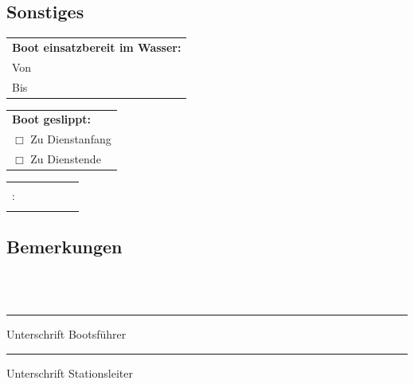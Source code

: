 \documentclass[a4paper, notitlepage, 10pt]{scrreprt}
\newcommand{\phantomspace}{\vphantom{A}}
\begin{document}
\begin{minipage}{\linewidth}
\vspace{4pt}\subsection*{Sonstiges}\vspace{-3pt}%
\renewcommand{\arraystretch}{1.2}
\begin{tabular}{ll}
\multicolumn{2}{l}{\textbf{Boot einsatzbereit im Wasser:}} \\
Von & \phantomspace\uline{\hphantom{00:00}} \\
Bis & \phantomspace\uline{\hphantom{00:00}}
\end{tabular}
\hfill
\begin{tabular}{l}
\textbf{Boot geslippt:}\\
$\Box$ Zu Dienstanfang\\
$\Box$ Zu Dienstende
\end{tabular}
\hfill
\begin{tabular}{>{\raggedright}p{0.10\linewidth}>{\raggedleft\arraybackslash}p{0.075\linewidth}}
\multicolumn{2}{l}{\textbf{Getankt:}} \\
\phantomspace\uline{\hfill}: & \phantomspace\uline{\hfill} \\ & 
\end{tabular}
\end{minipage}
\vspace{7pt}%
\vfill

\begin{minipage}{\linewidth}
\subsection*{Bemerkungen}\vspace{-6pt}
\uline{\phantomspace\hfill\mbox{}\newline\phantomspace\hfill\mbox{}\newline\phantomspace\hfill%
\mbox{}\newline\phantomspace\hfill%
}
\end{minipage}
\\\\\vspace{3pt}\vfill

\hfill\vfill\parbox[c][0pt][r]{150pt}{\hrule \vspace{3pt} Unterschrift Bootsführer \vspace{-2pt}}\hfill
 \parbox[c][0pt][r]{150pt}{\hrule \vspace{3pt} Unterschrift Stationsleiter \vspace{-2pt}}
\end{document}
